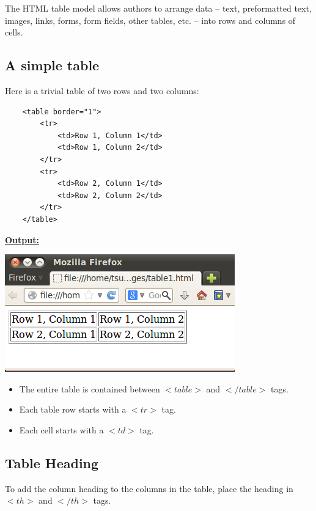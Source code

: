 \documentclass[11pt,a4paper]{article}
\begin{document}

The HTML table model allows authors to arrange data -- text, preformatted text, images, links, forms, form fields, other tables, etc. -- into rows and columns of cells.
\subsection*{A simple table}
Here is a trivial table of two rows and two columns:
\begin{verbatim}
    <table border="1">
        <tr>
            <td>Row 1, Column 1</td>
            <td>Row 1, Column 2</td>
        </tr>
        <tr>
            <td>Row 2, Column 1</td>
            <td>Row 2, Column 2</td>
        </tr>
    </table>
\end{verbatim}
\underline{\textbf{Output:}} 

\includegraphics[scale=0.7]{Table1.png}
\begin{itemize}
\item The entire table is contained between $<table>$ and $</table>$ tags.
\item Each table row starts with a $<tr>$ tag.
\item Each cell starts with a $<td>$ tag.
\end{itemize}

\subsection*{Table Heading}
To add the column heading to the columns in the table, place the heading in $<th>$ and $</th>$ tags.
\end{document}
